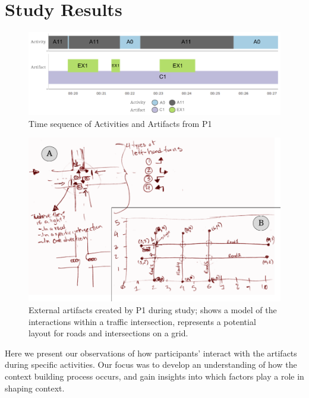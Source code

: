
\section{Study Results}



\begin{figure}
\includegraphics[width=1.01\columnwidth]{figures/P1timeplot}
\caption{Time sequence of Activities and Artifacts from P1}
\label{P1Fig}
\end{figure}

\begin{figure}
\includegraphics[width=\columnwidth]{figures/P4sketches}
\caption{External artifacts created by P1 during study; \protect{} shows a model of the interactions within a traffic intersection, \protect{} represents a potential layout for roads and intersections on a grid.}
\label{P4Sketch}
\end{figure}

Here we present our observations of how participants' interact with the artifacts during specific activities. Our focus was to develop an understanding of how the context building process occurs, and gain insights into which factors play a role in shaping context.

